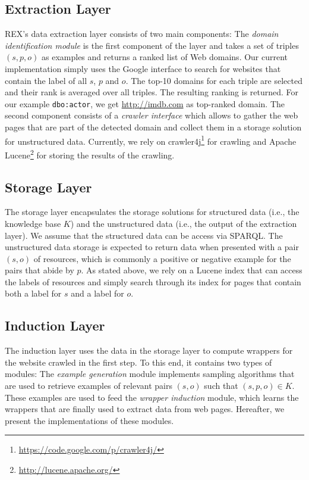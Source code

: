 \documentclass{llncs}
\begin{document}
\subsection{Extraction Layer}
REX's data extraction layer consists of two main components:
The \emph{domain identification module} is the first component of the layer and takes a set of triples $(s, p, o)$ as examples and returns a ranked list of Web domains.
Our current implementation simply uses the Google interface to search for websites that contain the label of all $s$, $p$ and $o$.
The top-10 domains for each triple are selected and their rank is averaged over all triples.
The resulting ranking is returned. 
For our example \texttt{dbo:actor}, we get \url{http://imdb.com} as top-ranked domain.
The second component consists of a \emph{crawler interface} which allows to gather the web pages that are part of the detected domain and collect them in a storage solution for unstructured data.
Currently, we rely on crawler4j\footnote{\url{https://code.google.com/p/crawler4j/}} for crawling and Apache Lucene\footnote{\url{http://lucene.apache.org/}} for storing the results of the crawling.  

\subsection{Storage Layer}
The storage layer encapsulates the storage solutions for structured data (i.e., the knowledge base $K$) and the unstructured data (i.e., the output of the extraction layer). 
We assume that the structured data can be access via SPARQL.
The unstructured data storage is expected to return data when presented with a pair $(s, o)$ of resources, which is commonly a positive or negative example for the pairs that abide by $p$.
As stated above, we rely on a Lucene index that can access the labels of resources and simply search through its index for pages that contain both a label for $s$ and a label for $o$.

\subsection{Induction Layer}
The induction layer uses the data in the storage layer to compute wrappers for the website crawled in the first step.
To this end, it contains two types of modules:
The \emph{example generation} module implements sampling algorithms that are used to retrieve examples of relevant pairs $(s, o)$ such that $(s, p, o) \in K$. 
These examples are used to feed the \emph{wrapper induction} module, which learns the wrappers that are finally used to extract data from web pages.
Hereafter, we present the implementations of these modules.
\end{document}

